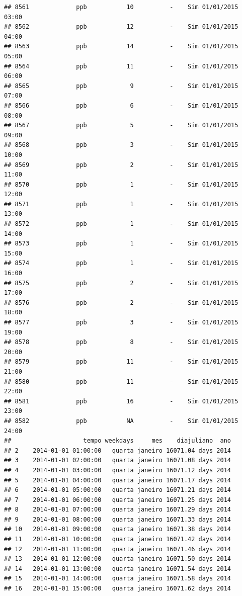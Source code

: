\documentclass[]{book}
\begin{document}
\begin{verbatim}
## 8561             ppb           10          -    Sim 01/01/2015 03:00
## 8562             ppb           12          -    Sim 01/01/2015 04:00
## 8563             ppb           14          -    Sim 01/01/2015 05:00
## 8564             ppb           11          -    Sim 01/01/2015 06:00
## 8565             ppb            9          -    Sim 01/01/2015 07:00
## 8566             ppb            6          -    Sim 01/01/2015 08:00
## 8567             ppb            5          -    Sim 01/01/2015 09:00
## 8568             ppb            3          -    Sim 01/01/2015 10:00
## 8569             ppb            2          -    Sim 01/01/2015 11:00
## 8570             ppb            1          -    Sim 01/01/2015 12:00
## 8571             ppb            1          -    Sim 01/01/2015 13:00
## 8572             ppb            1          -    Sim 01/01/2015 14:00
## 8573             ppb            1          -    Sim 01/01/2015 15:00
## 8574             ppb            1          -    Sim 01/01/2015 16:00
## 8575             ppb            2          -    Sim 01/01/2015 17:00
## 8576             ppb            2          -    Sim 01/01/2015 18:00
## 8577             ppb            3          -    Sim 01/01/2015 19:00
## 8578             ppb            8          -    Sim 01/01/2015 20:00
## 8579             ppb           11          -    Sim 01/01/2015 21:00
## 8580             ppb           11          -    Sim 01/01/2015 22:00
## 8581             ppb           16          -    Sim 01/01/2015 23:00
## 8582             ppb           NA          -    Sim 01/01/2015 24:00
##                    tempo weekdays     mes    diajuliano  ano
## 2    2014-01-01 01:00:00   quarta janeiro 16071.04 days 2014
## 3    2014-01-01 02:00:00   quarta janeiro 16071.08 days 2014
## 4    2014-01-01 03:00:00   quarta janeiro 16071.12 days 2014
## 5    2014-01-01 04:00:00   quarta janeiro 16071.17 days 2014
## 6    2014-01-01 05:00:00   quarta janeiro 16071.21 days 2014
## 7    2014-01-01 06:00:00   quarta janeiro 16071.25 days 2014
## 8    2014-01-01 07:00:00   quarta janeiro 16071.29 days 2014
## 9    2014-01-01 08:00:00   quarta janeiro 16071.33 days 2014
## 10   2014-01-01 09:00:00   quarta janeiro 16071.38 days 2014
## 11   2014-01-01 10:00:00   quarta janeiro 16071.42 days 2014
## 12   2014-01-01 11:00:00   quarta janeiro 16071.46 days 2014
## 13   2014-01-01 12:00:00   quarta janeiro 16071.50 days 2014
## 14   2014-01-01 13:00:00   quarta janeiro 16071.54 days 2014
## 15   2014-01-01 14:00:00   quarta janeiro 16071.58 days 2014
## 16   2014-01-01 15:00:00   quarta janeiro 16071.62 days 2014

\end{verbatim}
\end{document}
